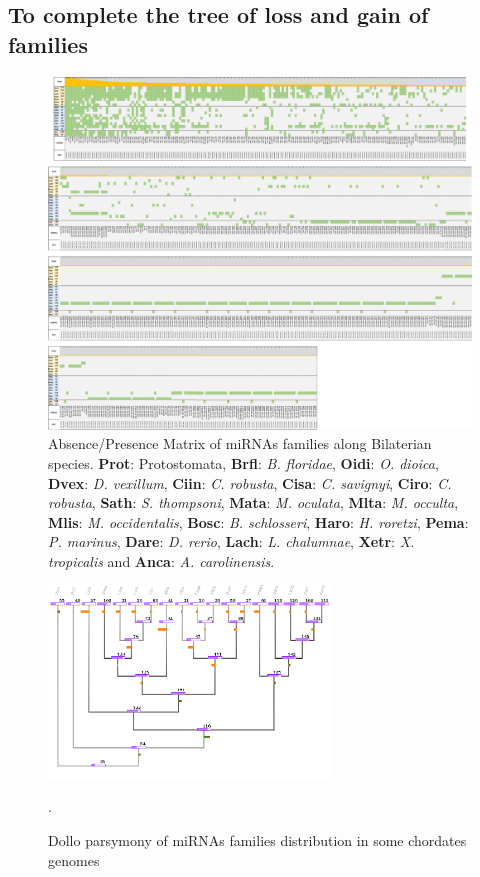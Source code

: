 \documentclass[graybox]{svmult}
\begin{document}
\subsection{To complete the tree of loss and gain of families}

\begin{figure}[ht!]
\centering 
\includegraphics[width=\textwidth, angle=90]{./Images/miRNA_matrix}
\caption{Absence/Presence Matrix of miRNAs families along Bilaterian species. 
\textbf{Prot}: Protostomata, \textbf{Brfl}: \textit{B. floridae}, 
\textbf{Oidi}: \textit{O. dioica}, \textbf{Dvex}: \textit{D. vexillum}, 
\textbf{Ciin}: \textit{C. robusta}, \textbf{Cisa}: \textit{C. savignyi}, 
\textbf{Ciro}: \textit{C. robusta}, \textbf{Sath}: \textit{S. thompsoni}, 
\textbf{Mata}: \textit{M. oculata}, \textbf{Mlta}: \textit{M. occulta}, 
\textbf{Mlis}: \textit{M. occidentalis}, \textbf{Bosc}: \textit{B. schlosseri}, 
\textbf{Haro}: \textit{H. roretzi}, \textbf{Pema}: \textit{P. marinus}, 
\textbf{Dare}: \textit{D. rerio}, \textbf{Lach}: \textit{L. chalumnae}, 
\textbf{Xetr}: \textit{X. tropicalis} and \textbf{Anca}: \textit{A. 
carolinensis}. }
\label{fig:matrimirnas}
\end{figure}

\begin{figure}[t]
\sidecaption[t]
\includegraphics[width=7.5cm]{./Images/last_tree.png}
\caption{Dollo parsymony of miRNAs families distribution in some 
chordates genomes}.
\label{fig:dollotree}
\end{figure}
\end{document}
